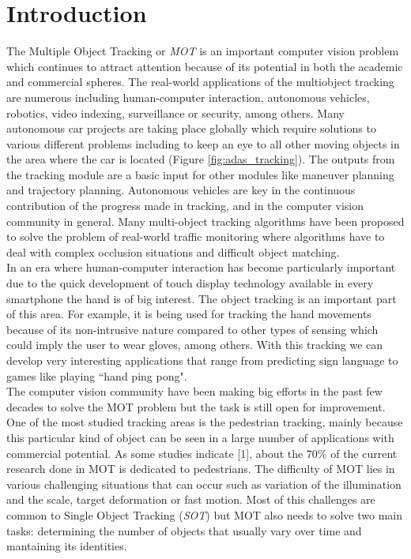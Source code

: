 \chapter{Introduction}\label{cap.introduccion}
\setlength{\parindent}{0pt}
The Multiple Object Tracking or \textit{MOT} is an important computer vision problem which continues to attract attention because of its potential in both the academic and commercial spheres. The real-world applications of the multiobject tracking are numerous including human-computer interaction, autonomous vehicles, robotics, video indexing, surveillance or security, among others. Many autonomous car projects are taking place globally which require solutions to various different problems including to keep an eye to all other moving objects in the area where the car is located (Figure \ref{fig:adas_tracking}). The outputs from the tracking module are a basic input for other modules like maneuver planning and trajectory planning. Autonomous vehicles are key in the continuous contribution of the progress made in tracking, and in the computer vision community in general. Many multi-object tracking algorithms have been proposed to solve the problem of real-world traffic monitoring where algorithms have to deal with complex occlusion situations and difficult object matching.\\
In an era where human-computer interaction has become particularly important due to the quick development of touch display technology available in every smartphone the hand is of big interest. The object tracking is an important part of this area. For example, it is being used for tracking the hand movements because of its non-intrusive nature compared to other types of sensing which could imply the user to wear gloves, among others. With this tracking we can develop very interesting applications that range from predicting sign language to games like playing ``hand ping pong".
\\
The computer vision community have been making big efforts in the past few decades to solve the MOT problem but the task is still open for improvement. One of the most studied tracking areas is the pedestrian tracking, mainly because this particular kind of object can be seen in a large number of applications with commercial potential. As some studies indicate [1], about the 70\% of the current research done in MOT is dedicated to pedestrians. The difficulty of MOT lies in various challenging situations that can occur such as variation of the illumination and the scale, target deformation or fast motion. Most of this challenges are common to Single Object Tracking (\textit{SOT}) but MOT also needs to solve two main tasks: determining the number of objects that usually vary over time and mantaining its identities.\\
